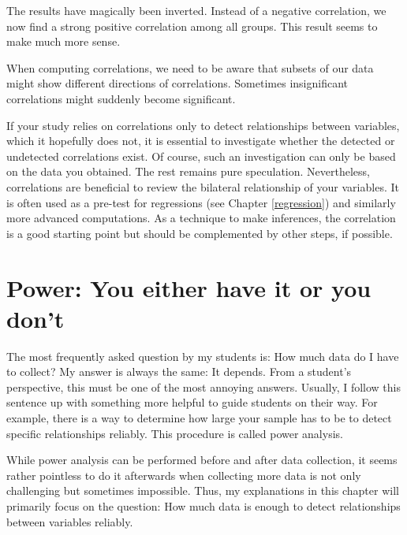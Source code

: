 \documentclass[
]{book}
\begin{document}
The results have magically been inverted. Instead of a negative correlation, we now find a strong positive correlation among all groups. This result seems to make much more sense.

When computing correlations, we need to be aware that subsets of our data might show different directions of correlations. Sometimes insignificant correlations might suddenly become significant.

If your study relies on correlations only to detect relationships between variables, which it hopefully does not, it is essential to investigate whether the detected or undetected correlations exist. Of course, such an investigation can only be based on the data you obtained. The rest remains pure speculation. Nevertheless, correlations are beneficial to review the bilateral relationship of your variables. It is often used as a pre-test for regressions (see Chapter \ref{regression}) and similarly more advanced computations. As a technique to make inferences, the correlation is a good starting point but should be complemented by other steps, if possible.

\hypertarget{power-analysis}{%
\chapter{Power: You either have it or you don't}\label{power-analysis}}

The most frequently asked question by my students is: How much data do I have to collect? My answer is always the same: It depends. From a student's perspective, this must be one of the most annoying answers. Usually, I follow this sentence up with something more helpful to guide students on their way. For example, there is a way to determine how large your sample has to be to detect specific relationships reliably. This procedure is called power analysis.

While power analysis can be performed before and after data collection, it seems rather pointless to do it afterwards when collecting more data is not only challenging but sometimes impossible. Thus, my explanations in this chapter will primarily focus on the question: How much data is enough to detect relationships between variables reliably.
\end{document}

